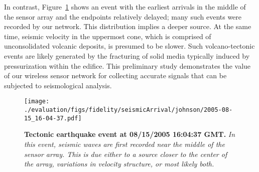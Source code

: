 In contrast, Figure~\ref{fig-jjTectonic} shows an event with the earliest
arrivals in the middle of the sensor array and the endpoints relatively
delayed; many such events were recorded by our network. 
This distribution implies a deeper source.  At the same time,
seismic velocity in the uppermost cone, which is comprised of unconsolidated
volcanic deposits, is presumed to be slower.  Such volcano-tectonic events
are likely generated by the fracturing of solid media typically induced
by pressurization within the edifice. This preliminary study
demonstrates the value of our wireless sensor network for collecting
accurate signals that can be subjected to seismological analysis.

\begin{figure}[t]
\begin{center}
\texttt{[image: ./evaluation/figs/fidelity/seismicArrival/johnson/2005-08-15\_16-04-37.pdf]}
\end{center}
\caption{\small{\bf Tectonic earthquake event at 08/15/2005 16:04:37
GMT.} {\em In this event, seismic waves are first recorded near the
middle of the sensor array. This is due either to a source closer 
to the center of the array, variations in velocity structure, 
or most likely both.}}
\label{fig-jjTectonic}
\end{figure}





